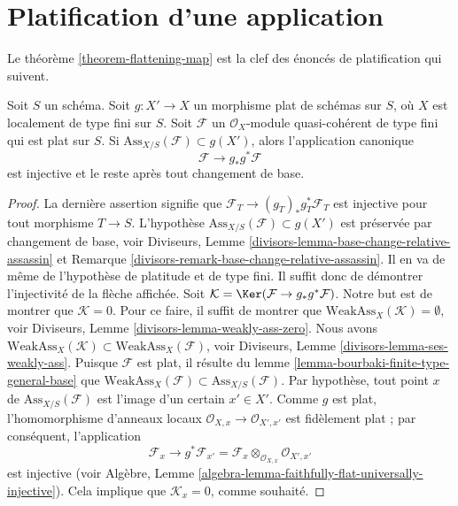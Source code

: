 \section{Platification d'une application}
\label{section-flattening-map}

\noindent
Le théorème \ref{theorem-flattening-map}
est la clef des énoncés de platification qui suivent.

\begin{lemma}
\label{lemma-universally-separating}
Soit $S$ un schéma.
Soit $g : X' \to X$ un morphisme plat de schémas sur $S$,
où $X$ est localement de type fini sur $S$.
Soit $\mathcal{F}$ un $\mathcal{O}_X$-module quasi-cohérent de type fini
qui est plat sur $S$. Si $\text{Ass}_{X/S}(\mathcal{F}) \subset g(X')$,
alors l'application canonique
$$
\mathcal{F} \longrightarrow g_*g^*\mathcal{F}
$$
est injective et le reste après tout changement de base.
\end{lemma}

\begin{proof}
La dernière assertion signifie que $\mathcal{F}_T \to (g_T)_*g_T^*\mathcal{F}_T$
est injective pour tout morphisme $T \to S$. L'hypothèse
$\text{Ass}_{X/S}(\mathcal{F}) \subset g(X')$ est préservée par changement de base, voir
Diviseurs, Lemme \ref{divisors-lemma-base-change-relative-assassin} et
Remarque \ref{divisors-remark-base-change-relative-assassin}.
Il en va de même de l'hypothèse de platitude et de type fini.
Il suffit donc de démontrer l'injectivité de la flèche affichée.
Soit $\mathcal{K} = \Ker(\mathcal{F} \to g_*g^*\mathcal{F})$.
Notre but est de montrer que $\mathcal{K} = 0$.
Pour ce faire, il suffit de montrer que
$\text{WeakAss}_X(\mathcal{K}) = \emptyset$, voir
Diviseurs, Lemme \ref{divisors-lemma-weakly-ass-zero}.
Nous avons
$\text{WeakAss}_X(\mathcal{K}) \subset \text{WeakAss}_X(\mathcal{F})$, voir
Diviseurs, Lemme \ref{divisors-lemma-ses-weakly-ass}.
Puisque $\mathcal{F}$ est plat, il résulte du
lemme \ref{lemma-bourbaki-finite-type-general-base}
que $\text{WeakAss}_X(\mathcal{F}) \subset \text{Ass}_{X/S}(\mathcal{F})$.
Par hypothèse, tout point $x$ de $\text{Ass}_{X/S}(\mathcal{F})$
est l'image d'un certain $x' \in X'$. Comme $g$ est plat, l'homomorphisme
d'anneaux locaux $\mathcal{O}_{X, x} \to \mathcal{O}_{X', x'}$
est fidèlement plat ; par conséquent, l'application
$$
\mathcal{F}_x
\longrightarrow
g^*\mathcal{F}_{x'} =
\mathcal{F}_x \otimes_{\mathcal{O}_{X, x}} \mathcal{O}_{X', x'}
$$
est injective (voir
Algèbre, Lemme \ref{algebra-lemma-faithfully-flat-universally-injective}).
Cela implique que $\mathcal{K}_x = 0$, comme souhaité.
\end{proof}

